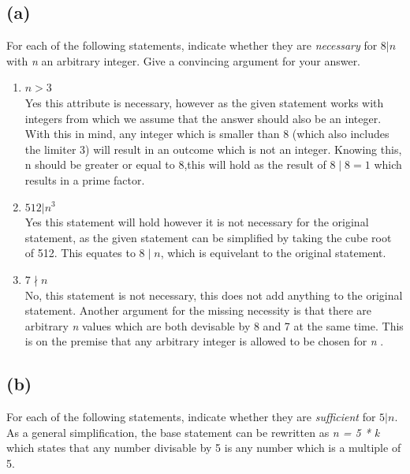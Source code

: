 \documentclass[a4paper]{article}
\begin{document}
\subsection*{(a)}
For each of the following statements, indicate whether they are \textit{necessary} for $8 | n$ with \textit{n} an arbitrary integer. Give a convincing argument for your answer.
\begin{enumerate}
    \item $ n > 3  $ \\
    Yes this attribute is necessary, however as the given statement works with integers from which we assume that the answer should also be an integer.
    With this in mind, any integer which is smaller than 8 (which also includes the limiter 3) will result in an outcome which is not an integer.
    Knowing this, n should be greater or equal to 8,this will hold as the result of $8 \mid 8 = 1$ which results in a prime factor.
    \item $ 512 | n^3 $ \\
    Yes this statement will hold however it is not necessary for the original statement, as the given statement can be simplified by taking the cube root of 512.
    This equates to $8 \mid n $, which is equivelant to the original statement.
    \item $ 7 \nmid n $ \\
    No, this statement is not necessary, this does not add anything to the original statement.
    Another argument for the missing necessity is that there are arbitrary \textit{n} values which are both devisable by 8 and 7 at the same time.
    This is on the premise that any arbitrary integer is allowed to be chosen for \textit{n} .
\end{enumerate} 
\subsection*{(b)}
For each of the following statements, indicate whether they are \textit{sufficient} for $5 | n$.
As a general simplification, the base statement can be rewritten as \textit{n = 5 * k} which states that any number divisable by 5 is any number which is a multiple of 5.
\end{document}
